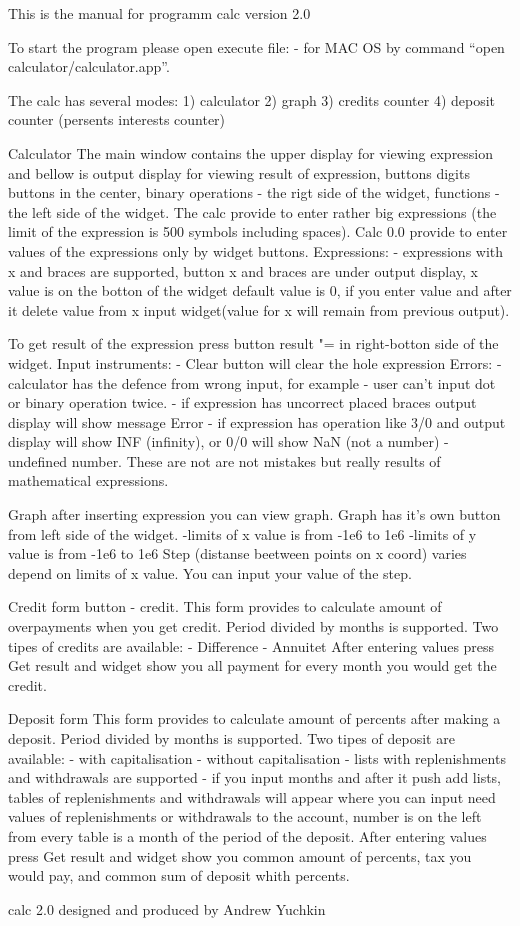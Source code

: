 \documentclass{article}
\begin{document}
This is the manual for programm calc version 2.0 

To start the program please open execute file:
- for MAC OS by command ``open calculator/calculator.app''. 


The calc has several modes:
1) calculator
2) graph
3) credits counter
4) deposit counter (persents interests counter)

Calculator
The main window contains the upper display for viewing expression and bellow is output display for viewing result of expression, buttons digits buttons in the center, binary operations - the rigt side of the widget, functions - the left side of the widget.  The calc provide to enter rather big expressions (the limit of the expression is 500 symbols including spaces). Calc 0.0 provide to enter values of the expressions only by widget buttons.
Expressions:
- expressions with x and braces are supported, button x and braces are under output display, x value is on the botton of the widget default value is 0, if you enter value and after it delete value from x input widget(value for x will remain from previous output).

To get result of the expression press button result "= in right-botton side of the widget.
Input instruments:
- Clear button will clear the hole expression
Errors:
- calculator has the defence from wrong input, for example - user can't input dot or binary operation twice.
- if expression has uncorrect placed braces output display will show message Error
- if expression has operation like 3/0 and output display will show INF (infinity), or 0/0 will show NaN (not a number) - undefined number. These are not are not mistakes but really results of mathematical expressions.  

Graph
after inserting expression you can view graph. Graph has it's own button from left side of the widget.
-limits of x value is from -1e6 to 1e6
-limits of y value is from -1e6 to 1e6
Step (distanse beetween points on x coord) varies depend on limits of x value.
You can input your value of the step.

Credit form
button - credit.
This form provides to calculate amount of overpayments when you get credit.
Period divided by months is supported.
Two tipes of credits are available:
- Difference
- Annuitet
After entering values press Get result and widget show you all payment for every month you would get the credit.

Deposit form
This form provides to calculate amount of percents after making a deposit.
Period divided by months is supported.
Two tipes of deposit are available:
- with capitalisation
- without capitalisation
- lists with replenishments and withdrawals are supported - if you input months and after it push add lists, tables of replenishments and withdrawals will appear where you can input need values of replenishments or withdrawals to the account, number is on the left from every table is a month of the period of the deposit.    
After entering values press Get result and widget show you common amount of percents, tax you would pay, and common sum of deposit whith percents.


calc 2.0 designed and produced by Andrew Yuchkin
\end{document}
